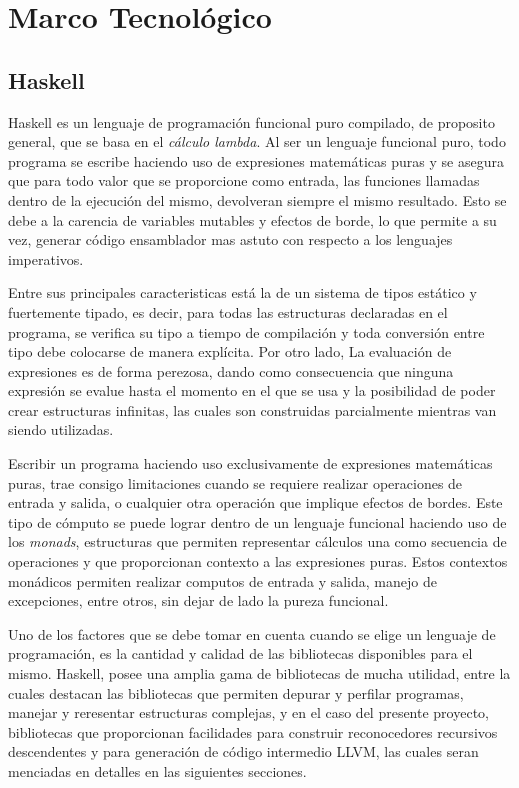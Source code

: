 \chapter{Marco Tecnológico}
\label{capitulo2}

\section{Haskell}
Haskell es un lenguaje de programación funcional puro compilado, de proposito
general, que se basa en el \textit{cálculo lambda}. Al ser un lenguaje
funcional puro, todo programa se escribe haciendo uso de expresiones
matemáticas puras y se asegura que para todo valor que se proporcione como
entrada, las funciones llamadas dentro de la ejecución del mismo, devolveran
siempre el mismo resultado. Esto se debe a la carencia de variables mutables y
efectos de borde, lo que permite a su vez, generar código ensamblador mas
astuto con respecto a los lenguajes imperativos.

Entre sus principales caracteristicas está la de un sistema de tipos estático
y fuertemente tipado, es decir, para todas las estructuras declaradas en el
programa, se verifica su tipo a tiempo de compilación y toda conversión entre
tipo debe colocarse de manera explícita. Por otro lado, La evaluación de
expresiones es de forma perezosa, dando como consecuencia que ninguna
expresión se evalue hasta el momento en el que se usa y la posibilidad de
poder crear estructuras infinitas, las cuales son construidas parcialmente
mientras van siendo utilizadas.

Escribir un programa haciendo uso exclusivamente de expresiones matemáticas
puras, trae consigo limitaciones cuando se requiere realizar operaciones de
entrada y salida, o cualquier otra operación que implique efectos de bordes.
Este tipo de cómputo se puede lograr dentro de un lenguaje funcional haciendo
uso de los \textit{monads}, estructuras que permiten representar cálculos una
como secuencia de operaciones y que proporcionan contexto a las expresiones
puras. Estos contextos monádicos permiten realizar computos de entrada y
salida, manejo de excepciones, entre otros, sin dejar de lado la pureza
funcional.

Uno de los factores que se debe tomar en cuenta cuando se elige un lenguaje de
programación, es la cantidad y calidad de las bibliotecas disponibles para el
mismo. Haskell, posee una amplia gama de bibliotecas de mucha utilidad, entre la
cuales destacan las bibliotecas que permiten depurar y perfilar programas,
manejar y reresentar estructuras complejas, y en el caso del presente
proyecto, bibliotecas que proporcionan facilidades para construir reconocedores
recursivos descendentes y para generación de código intermedio LLVM, las
cuales seran menciadas en detalles en las siguientes secciones.

